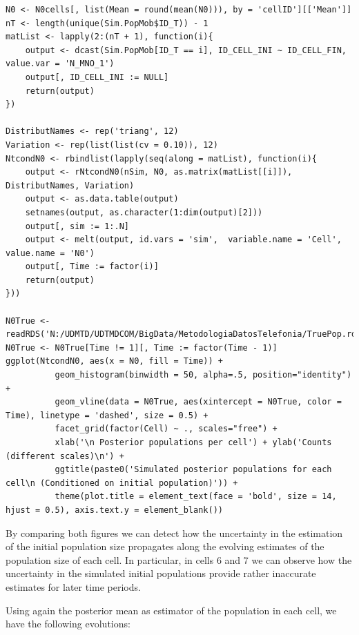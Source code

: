 \documentclass[12pt, a4paper]{article}
\begin{document}
\begin{verbatim}
N0 <- N0cells[, list(Mean = round(mean(N0))), by = 'cellID'][['Mean']]
nT <- length(unique(Sim.PopMob$ID_T)) - 1
matList <- lapply(2:(nT + 1), function(i){
    output <- dcast(Sim.PopMob[ID_T == i], ID_CELL_INI ~ ID_CELL_FIN, value.var = 'N_MNO_1')
    output[, ID_CELL_INI := NULL]
    return(output)
})

DistributNames <- rep('triang', 12)
Variation <- rep(list(list(cv = 0.10)), 12)
NtcondN0 <- rbindlist(lapply(seq(along = matList), function(i){
    output <- rNtcondN0(nSim, N0, as.matrix(matList[[i]]),  DistributNames, Variation)
    output <- as.data.table(output)
    setnames(output, as.character(1:dim(output)[2]))
    output[, sim := 1:.N]
    output <- melt(output, id.vars = 'sim',  variable.name = 'Cell', value.name = 'N0')
    output[, Time := factor(i)]
    return(output)
}))

N0True <- readRDS('N:/UDMTD/UDTMDCOM/BigData/MetodologiaDatosTelefonia/TruePop.rds')
N0True <- N0True[Time != 1][, Time := factor(Time - 1)]
ggplot(NtcondN0, aes(x = N0, fill = Time)) + 
          geom_histogram(binwidth = 50, alpha=.5, position="identity") + 
          geom_vline(data = N0True, aes(xintercept = N0True, color = Time), linetype = 'dashed', size = 0.5) + 
          facet_grid(factor(Cell) ~ ., scales="free") +
          xlab('\n Posterior populations per cell') + ylab('Counts (different scales)\n') +
          ggtitle(paste0('Simulated posterior populations for each cell\n (Conditioned on initial population)')) +
          theme(plot.title = element_text(face = 'bold', size = 14, hjust = 0.5), axis.text.y = element_blank())  
\end{verbatim}

By comparing both figures we can detect how the uncertainty in the estimation of the initial population size propagates along the evolving estimates of the population size of each cell. In particular, in cells 6 and 7 we can observe how the uncertainty in the simulated initial populations provide rather inaccurate estimates for later time periods. 

Using again the posterior mean as estimator of the population in each cell, we have the following evolutions:
\end{document}
